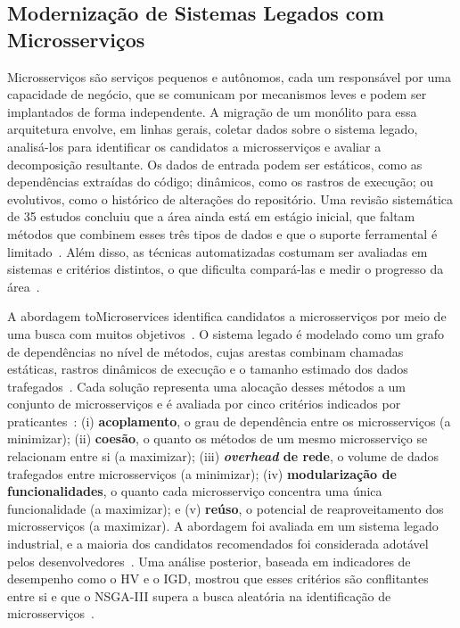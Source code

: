 \documentclass[conference]{IEEEtran}
\begin{document}
\subsection{Modernização de Sistemas Legados com Microsserviços}\label{sec:microsservicos}

Microsserviços são serviços pequenos e autônomos, cada um responsável por uma capacidade de negócio, que se comunicam por mecanismos leves e podem ser implantados de forma independente. A migração de um monólito para essa arquitetura envolve, em linhas gerais, coletar dados sobre o sistema legado, analisá-los para identificar os candidatos a microsserviços e avaliar a decomposição resultante. Os dados de entrada podem ser estáticos, como as dependências extraídas do código; dinâmicos, como os rastros de execução; ou evolutivos, como o histórico de alterações do repositório. Uma revisão sistemática de 35 estudos concluiu que a área ainda está em estágio inicial, que faltam métodos que combinem esses três tipos de dados e que o suporte ferramental é limitado~\cite{abgaz2023}. Além disso, as técnicas automatizadas costumam ser avaliadas em sistemas e critérios distintos, o que dificulta compará-las e medir o progresso da área~\cite{wang2024}.

A abordagem toMicroservices identifica candidatos a microsserviços por meio de uma busca com muitos objetivos~\cite{carvalho2020}. O sistema legado é modelado como um grafo de dependências no nível de métodos, cujas arestas combinam chamadas estáticas, rastros dinâmicos de execução e o tamanho estimado dos dados trafegados~\cite{castanho2026hitl}. Cada solução representa uma alocação desses métodos a um conjunto de microsserviços e é avaliada por cinco critérios indicados por praticantes~\cite{carvalho2020,assuncao2021}: (i) \textbf{acoplamento}, o grau de dependência entre os microsserviços (a minimizar); (ii) \textbf{coesão}, o quanto os métodos de um mesmo microsserviço se relacionam entre si (a maximizar); (iii) \textbf{\textit{overhead} de rede}, o volume de dados trafegados entre microsserviços (a minimizar); (iv) \textbf{modularização de funcionalidades}, o quanto cada microsserviço concentra uma única funcionalidade (a maximizar); e (v) \textbf{reúso}, o potencial de reaproveitamento dos microsserviços (a maximizar). A abordagem foi avaliada em um sistema legado industrial, e a maioria dos candidatos recomendados foi considerada adotável pelos desenvolvedores~\cite{carvalho2020}. Uma análise posterior, baseada em indicadores de desempenho como o HV e o IGD, mostrou que esses critérios são conflitantes entre si e que o NSGA-III supera a busca aleatória na identificação de microsserviços~\cite{assuncao2022}.
\end{document}
